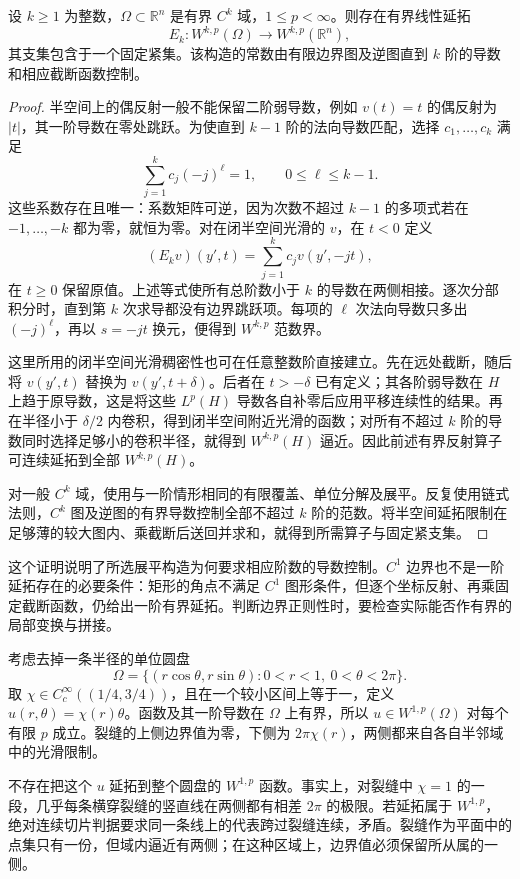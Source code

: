 \begin{proposition}\label{g3:prop:higher-order-boundary-extension}
	设 \(k\ge1\) 为整数，\(\Omega\subset\mathbb R^n\) 是有界 \(C^k\) 域，\(1\le p<\infty\)。则存在有界线性延拓
	\[
		E_k:W^{k,p}(\Omega)\longrightarrow W^{k,p}(\mathbb R^n),
	\]
	其支集包含于一个固定紧集。该构造的常数由有限边界图及逆图直到 \(k\) 阶的导数和相应截断函数控制。
\end{proposition}
\begin{proof}
	半空间上的偶反射一般不能保留二阶弱导数，例如 \(v(t)=t\) 的偶反射为 \(|t|\)，其一阶导数在零处跳跃。为使直到 \(k-1\) 阶的法向导数匹配，选择 \(c_1,\ldots,c_k\) 满足
	\[
		\sum_{j=1}^k c_j(-j)^\ell=1,
		\qquad 0\le\ell\le k-1.
	\]
	这些系数存在且唯一：系数矩阵可逆，因为次数不超过 \(k-1\) 的多项式若在 \(-1,\ldots,-k\) 都为零，就恒为零。对在闭半空间光滑的 \(v\)，在 \(t<0\) 定义
	\[
		(E_kv)(y',t)=\sum_{j=1}^k c_jv(y',-jt),
	\]
	在 \(t\ge0\) 保留原值。上述等式使所有总阶数小于 \(k\) 的导数在两侧相接。逐次分部积分时，直到第 \(k\) 次求导都没有边界跳跃项。每项的 \(\ell\) 次法向导数只多出 \((-j)^\ell\)，再以 \(s=-jt\) 换元，便得到 \(W^{k,p}\) 范数界。

	这里所用的闭半空间光滑稠密性也可在任意整数阶直接建立。先在远处截断，随后将 \(v(y',t)\) 替换为 \(v(y',t+\delta)\)。后者在 \(t>-\delta\) 已有定义；其各阶弱导数在 \(H\) 上趋于原导数，这是将这些 \(L^p(H)\) 导数各自补零后应用平移连续性的结果。再在半径小于 \(\delta/2\) 内卷积，得到闭半空间附近光滑的函数；对所有不超过 \(k\) 阶的导数同时选择足够小的卷积半径，就得到 \(W^{k,p}(H)\) 逼近。因此前述有界反射算子可连续延拓到全部 \(W^{k,p}(H)\)。

	对一般 \(C^k\) 域，使用与一阶情形相同的有限覆盖、单位分解及展平。反复使用链式法则，\(C^k\) 图及逆图的有界导数控制全部不超过 \(k\) 阶的范数。将半空间延拓限制在足够薄的较大图内、乘截断后送回并求和，就得到所需算子与固定紧支集。
\end{proof}

这个证明说明了所选展平构造为何要求相应阶数的导数控制。\(C^1\) 边界也不是一阶延拓存在的必要条件：矩形的角点不满足 \(C^1\) 图形条件，但逐个坐标反射、再乘固定截断函数，仍给出一阶有界延拓。判断边界正则性时，要检查实际能否作有界的局部变换与拼接。

\begin{example}\label{g3:exm:slit-domain-traces}
	考虑去掉一条半径的单位圆盘
	\[
		\Omega=\{(r\cos\theta,r\sin\theta):0<r<1,\ 0<\theta<2\pi\}.
	\]
	取 \(\chi\in C_c^\infty((1/4,3/4))\)，且在一个较小区间上等于一，定义 \(u(r,\theta)=\chi(r)\theta\)。函数及其一阶导数在 \(\Omega\) 上有界，所以 \(u\in W^{1,p}(\Omega)\) 对每个有限 \(p\) 成立。裂缝的上侧边界值为零，下侧为 \(2\pi\chi(r)\)，两侧都来自各自半邻域中的光滑限制。

	不存在把这个 \(u\) 延拓到整个圆盘的 \(W^{1,p}\) 函数。事实上，对裂缝中 \(\chi=1\) 的一段，几乎每条横穿裂缝的竖直线在两侧都有相差 \(2\pi\) 的极限。若延拓属于 \(W^{1,p}\)，绝对连续切片判据要求同一条线上的代表跨过裂缝连续，矛盾。裂缝作为平面中的点集只有一份，但域内逼近有两侧；在这种区域上，边界值必须保留所从属的一侧。
\end{example}
